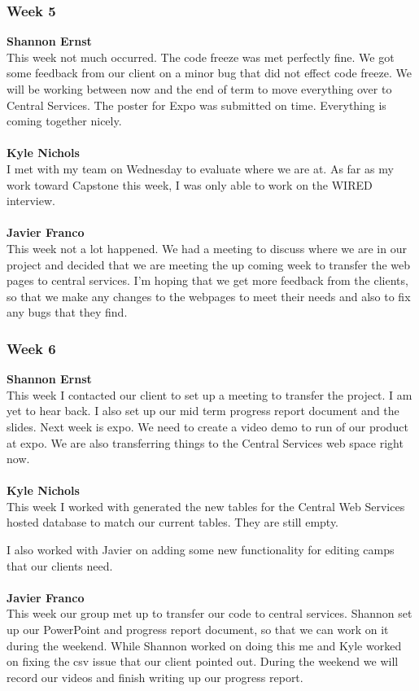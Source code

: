 \documentclass[../final.tex]{subfiles}
\begin{document}
\subsubsection{Week 5}
\textbf{Shannon Ernst}\\
This week not much occurred. The code freeze was met perfectly fine. We got some feedback from our client on a minor bug that did not effect code freeze. We will be working between now and the end of term to move everything over to Central Services. The poster for Expo was submitted on time. Everything is coming together nicely. \\ \\
\textbf{Kyle Nichols}\\ 
I met with my team on Wednesday to evaluate where we are at. As far as my work toward Capstone this week, I was only able to work on the WIRED interview.\\ \\
\textbf{Javier Franco}\\
This week not a lot happened. We had a meeting to discuss where we are in our project and decided that we are meeting the up coming week to transfer the web pages to central services. I'm hoping that we get more feedback from the clients, so that we make any changes to the webpages to meet their needs and also to fix any bugs that they find. \\
\subsubsection{Week 6}
\textbf{Shannon Ernst}\\
This week I contacted our client to set up a meeting to transfer the project. I am yet to hear back. I also set up our mid term progress report document and the slides. Next week is expo. We need to create a video demo to run of our product at expo. We are also transferring things to the Central Services web space right now. \\ \\
\textbf{Kyle Nichols}\\
This week I worked with generated the new tables for the Central Web Services hosted database to match our current tables. They are still empty.

I also worked with Javier on adding some new functionality for editing camps that our clients need. \\ \\
\textbf{Javier Franco}\\
This week our group met up to transfer our code to central services. Shannon set up our PowerPoint and progress report document, so that we can work on it during the weekend. While Shannon worked on doing this me and Kyle worked on fixing the csv issue that our client pointed out. During the weekend we will record our videos and finish writing up our progress report. \\
\end{document}
